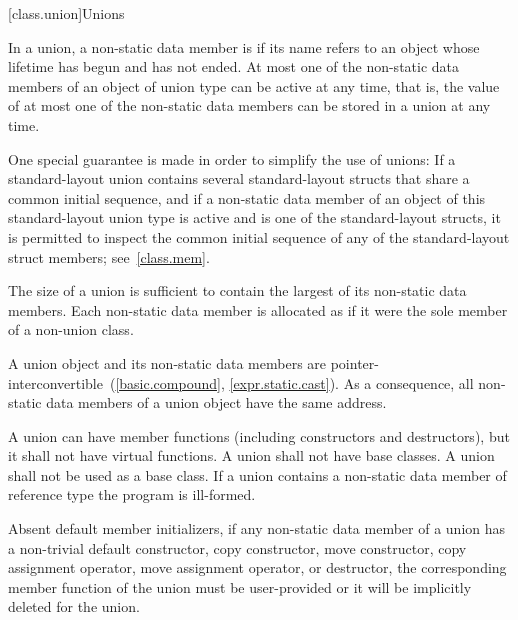 [class.union]{Unions}%

\pnum
In a union,
a non-static data member is 
if its name refers to an object
whose lifetime has begun and has not ended.
At most one of the non-static data members of an object of union type
can be active at any
time, that is, the value of at most one of the non-static data members can be
stored in a union at any time. \begin{note} One special guarantee is made in order to
simplify the use of unions: If a standard-layout union contains several standard-layout
structs that share a common initial sequence, and
if a non-static data member of an object of this standard-layout union type
is active and is one of the standard-layout structs,
it is permitted to inspect the common initial sequence
of any of the standard-layout struct members;
see~\ref{class.mem}.
\end{note}

\pnum
The size of a union is sufficient to contain the largest
of its non-static data members. Each non-static data member is allocated
as if it were the sole member of a non-union class.
\begin{note}
A union object and its non-static data members are
pointer-interconvertible~(\ref{basic.compound}, \ref{expr.static.cast}).
As a consequence, all non-static data members of a
union object have the same address.
\end{note}

\pnum
{}%
%
%
A union can have member functions (including constructors and destructors),
%
but it shall not have virtual functions. A union shall not have
base classes. A union shall not be used as a base class.
%
If a union contains a non-static data member of
reference type the program is ill-formed.
\begin{note} Absent default member initializers,
if any non-static data member of a union has a non-trivial
default constructor,
copy constructor, move constructor,
copy assignment operator, move assignment operator,
or destructor, the corresponding member function
of the union must be user-provided or it will
be implicitly deleted for the union. \end{note}

